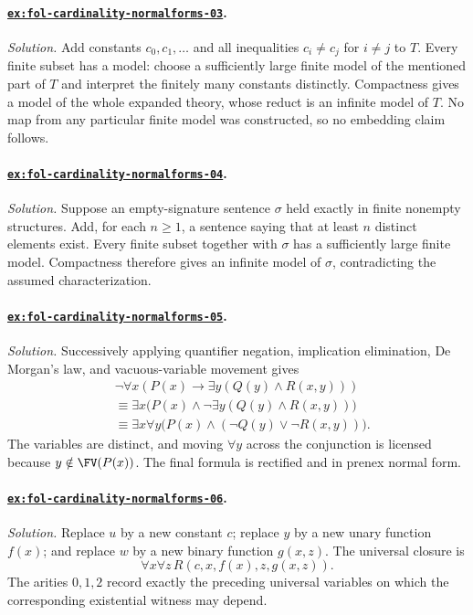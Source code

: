 \paragraph{\hyperref[ex:fol-cardinality-normalforms-03]{\texttt{ex:fol-cardinality-normalforms-03}}.}
\textit{Solution.}  Add constants \(c_0,c_1,\ldots\) and all inequalities
\(c_i\ne c_j\) for \(i\ne j\) to \(T\).  Every finite subset has a model:
choose a sufficiently large finite model of the mentioned part of \(T\) and
interpret the finitely many constants distinctly.  Compactness gives a model
of the whole expanded theory, whose reduct is an infinite model of \(T\).  No
map from any particular finite model was constructed, so no embedding claim
follows.

\paragraph{\hyperref[ex:fol-cardinality-normalforms-04]{\texttt{ex:fol-cardinality-normalforms-04}}.}
\textit{Solution.}  Suppose an empty-signature sentence \(\sigma\) held exactly
in finite nonempty structures.  Add, for each \(n\geq1\), a sentence saying
that at least \(n\) distinct elements exist.  Every finite subset together with
\(\sigma\) has a sufficiently large finite model.  Compactness therefore gives
an infinite model of \(\sigma\), contradicting the assumed characterization.

\paragraph{\hyperref[ex:fol-cardinality-normalforms-05]{\texttt{ex:fol-cardinality-normalforms-05}}.}
\textit{Solution.}  Successively applying quantifier negation, implication
elimination, De Morgan's law, and vacuous-variable movement gives
\[
\begin{aligned}
&\neg\forall x(P(x)\to\exists y(Q(y)\land R(x,y)))\\
&\equiv\exists x\bigl(P(x)\land\neg\exists y(Q(y)\land R(x,y))\bigr)\\
&\equiv\exists x\forall y
  \bigl(P(x)\land(\neg Q(y)\lor\neg R(x,y))\bigr).
\end{aligned}
\]
The variables are distinct, and moving \(\forall y\) across the conjunction is
licensed because \(y\notin\FV(P(x))\).  The final formula is rectified and in
prenex normal form.

\paragraph{\hyperref[ex:fol-cardinality-normalforms-06]{\texttt{ex:fol-cardinality-normalforms-06}}.}
\textit{Solution.}  Replace \(u\) by a new constant \(c\); replace \(y\) by a
new unary function \(f(x)\); and replace \(w\) by a new binary function
\(g(x,z)\).  The universal closure is
\[
\forall x\forall z\,R(c,x,f(x),z,g(x,z)).
\]
The arities \(0,1,2\) record exactly the preceding universal variables on which
the corresponding existential witness may depend.

